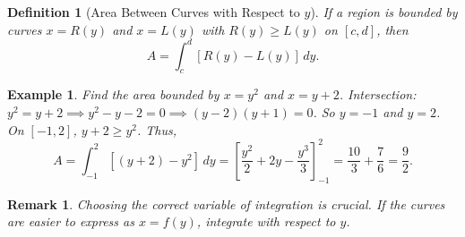\documentclass[11pt,a4paper]{article}
\newtheorem{example}{Example}
\newtheorem{definition}{Definition}
\newtheorem{remark}{Remark}
\begin{document}
\begin{center}
\end{center}
\begin{definition}[Area Between Curves with Respect to $y$]
If a region is bounded by curves $x = R(y)$ and $x = L(y)$ with $R(y) \geq L(y)$ on $[c, d]$, then
\[
A = \int_c^d [R(y) - L(y)] \, dy.
\]
\end{definition}
\begin{example}
Find the area bounded by $x = y^2$ and $x = y + 2$.
Intersection: $y^2 = y + 2 \implies y^2 - y - 2 = 0 \implies (y - 2)(y + 1) = 0$. So $y = -1$ and $y = 2$.
On $[-1, 2]$, $y + 2 \geq y^2$. Thus,
\[
A = \int_{-1}^2 [(y + 2) - y^2] \, dy = \left[ \frac{y^2}{2} + 2y - \frac{y^3}{3} \right]_{-1}^2 = \frac{10}{3} + \frac{7}{6} = \frac{9}{2}.
\]
\end{example}
\begin{remark}
Choosing the correct variable of integration is crucial. If the curves are easier to express as $x = f(y)$, integrate with respect to $y$.
\end{remark}
\end{document}
